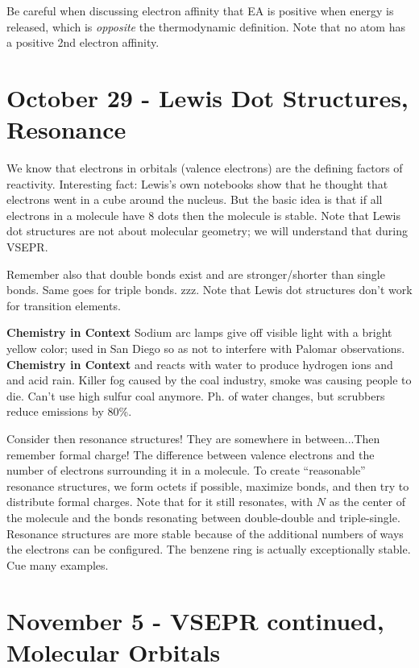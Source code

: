 \documentclass{report}
\begin{document}
Be careful when discussing electron affinity that EA is positive when energy is released, which is \emph{opposite} the thermodynamic definition. Note that no atom has a positive 2nd electron affinity. 

\chapter{October 29 - Lewis Dot Structures, Resonance}

We know that electrons in orbitals (valence electrons) are the defining factors of reactivity. Interesting fact: Lewis's own notebooks show that he thought that electrons went in a cube around the nucleus. But the basic idea is that if all electrons in a molecule have $8$ dots then the molecule is stable. Note that Lewis dot structures are not about molecular geometry; we will understand that during VSEPR. 

Remember also that double bonds exist and are stronger/shorter than single bonds. Same goes for triple bonds. zzz. Note that Lewis dot structures don't work for transition elements. 

\begin{center}
\textbf{Chemistry in Context} Sodium arc lamps give off visible light with a bright yellow color; used in San Diego so as not to interfere with Palomar observations.
\textbf{Chemistry in Context}  and  reacts with water to produce hydrogen ions and  and  acid rain. Killer fog caused by the coal industry, smoke was causing people to die. Can't use high sulfur coal anymore. Ph. of water changes, but  scrubbers reduce emissions by 80\%.
\end{center}

Consider then resonance structures! They are somewhere in between...Then remember formal charge! The difference between valence electrons and the number of electrons surrounding it in a molecule. To create ``reasonable'' resonance structures, we form octets if possible, maximize bonds, and then try to distribute formal charges. Note that for  it still resonates, with $N$ as the center of the molecule and the bonds resonating between double-double and triple-single. Resonance structures are more stable because of the additional numbers of ways the electrons can be configured. The benzene ring is actually exceptionally stable. Cue many examples. 

\chapter{November 5 - VSEPR continued, Molecular Orbitals}
\end{document}
